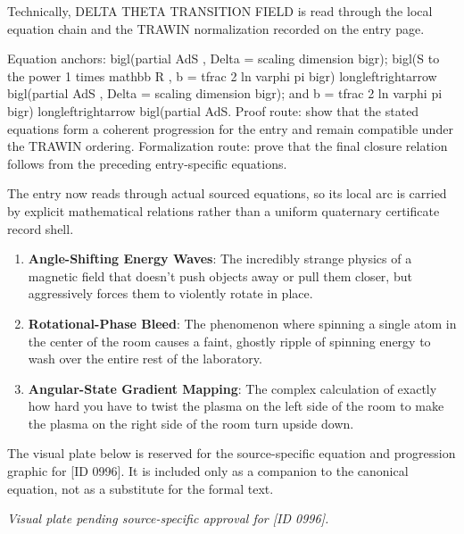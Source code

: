 Technically, DELTA THETA TRANSITION FIELD is read through the local equation chain and the TRAWIN normalization recorded on the entry page.

Equation anchors: bigl(partial AdS , Delta = scaling dimension bigr); bigl(S to the power 1 times mathbb R , b = tfrac 2 ln varphi pi bigr) longleftrightarrow bigl(partial AdS , Delta = scaling dimension bigr); and b = tfrac 2 ln varphi pi bigr) longleftrightarrow bigl(partial AdS. Proof route: show that the stated equations form a coherent progression for the entry and remain compatible under the TRAWIN ordering. Formalization route: prove that the final closure relation follows from the preceding entry-specific equations.

The entry now reads through actual sourced equations, so its local arc is carried by explicit mathematical relations rather than a uniform quaternary certificate record shell.
\endgroup

\begin{enumerate}[leftmargin=1.6em,itemsep=6pt,topsep=4pt]
\item \textbf{Angle-Shifting Energy Waves}: The incredibly strange physics of a magnetic field that doesn't push objects away or pull them closer, but aggressively forces them to violently rotate in place.
\item \textbf{Rotational-Phase Bleed}: The phenomenon where spinning a single atom in the center of the room causes a faint, ghostly ripple of spinning energy to wash over the entire rest of the laboratory.
\item \textbf{Angular-State Gradient Mapping}: The complex calculation of exactly how hard you have to twist the plasma on the left side of the room to make the plasma on the right side of the room turn upside down.
\end{enumerate}

\begingroup\footnotesize\sloppy
The visual plate below is reserved for the source-specific equation and progression graphic for [ID 0996]. It is included only as a companion to the canonical equation, not as a substitute for the formal text.
\par\endgroup
\begingroup\footnotesize\itshape
Visual plate pending source-specific approval for [ID 0996].
\par\endgroup

